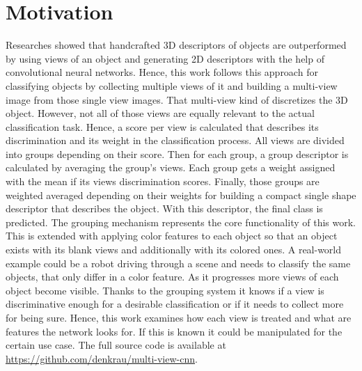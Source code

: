 \section{Motivation}
\label{sec:overview-motivation}
Researches showed that handcrafted 3D descriptors of objects are outperformed by using views of an object and generating 2D descriptors with the help of convolutional neural networks.
Hence, this work follows this approach for classifying objects by collecting multiple views of it and building a multi-view image from those single view images.
That multi-view kind of discretizes the 3D object. 
However, not all of those views are equally relevant to the actual classification task.
Hence, a score per view is calculated that describes its discrimination and its weight in the classification process.
All views are divided into groups depending on their score.
Then for each group, a group descriptor is calculated by averaging the group's views.
Each group gets a weight assigned with the mean if its views discrimination scores.
Finally, those groups are weighted averaged depending on their weights for building a compact single shape descriptor that describes the object.
With this descriptor, the final class is predicted.
The grouping mechanism represents the core functionality of this work.
This is extended with applying color features to each object so that an object exists with its blank views and additionally with its colored ones.
A real-world example could be a robot driving through a scene and needs to classify the same objects, that only differ in a color feature.
As it progresses more views of each object become visible.
Thanks to the grouping system it knows if a view is discriminative enough for a desirable classification or if it needs to collect more for being sure.
Hence, this work examines how each view is treated and what are features the network looks for.
If this is known it could be manipulated for the certain use case.
The full source code is available at \url{https://github.com/denkrau/multi-view-cnn}.